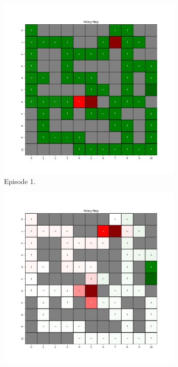\documentclass{assignment}
\begin{document}
\begin{figure}[H]
    \begin{subfigure}{0.3\textwidth}
        \includegraphics[width=\textwidth]{figures/policy_td/alpha_sweep/policy_alpha_0.001_gamma_0.95_epsilon_0.2_iteration_1.png}
    \caption{Episode 1.}
    \end{subfigure}\hfill
    \begin{subfigure}{0.3\textwidth}
        \includegraphics[width=\textwidth]{figures/policy_td/alpha_sweep/policy_alpha_0.001_gamma_0.95_epsilon_0.2_iteration_50.png}

\end{subfigure}
\end{figure}
\end{document}
